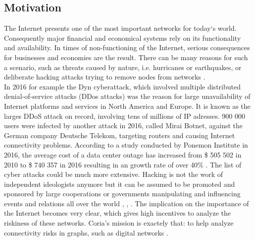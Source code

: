 \documentclass[conference, 11pt]{IEEEtran}
\begin{document}
\subsection{Motivation}
The Internet presents one of the most important networks for today‘s world. Consequently major financial and economical systems rely on its functionality and availability. In times of non-functioning of the Internet, serious consequences for businesses and economies are the result. There can be many reasons for such a scenario, such as threats caused by nature, i.e. hurricanes or earthquakes, or deliberate hacking attacks trying to remove nodes from networks \cite{threats}.\\ \linebreak
In 2016 for example the Dyn cyberattack, which involved multiple distributed denial-of-service attacks (DDos attacks) was the reason for large unavailability of Internet platforms and services in North America and Europe. It is known as the larges DDoS attack on record, involving tens of millions of IP adresses\cite{dyn}. 900 000 users were infected by another attack in 2016, called Mirai Botnet, against the German company Deutsche Telekom, targeting routers and causing Internet connectivity problems\cite{DT}. According to a study conducted by Ponemon Institute in 2016, the average cost of a data center outage has increased from \$ 505 502 in 2010 to \$ 740 357 in 2016 resulting in an growth rate of over 40\% \cite{Ponemon}. The list of cyber attacks could be much more extensive. Hacking is not the work of independent ideologists anymore but it can be assumed to be promoted and sponsored by large cooperations or governments manipulating and influencing events and relations all over the world \cite{cyberSponsors}, \cite{cyberSponsors2}, \cite{cyberSponsors3}. The implication on the importance of the Internet becomes very clear, which gives high incentives to analyze the riskiness of these networks. Coria's mission is exactely that: to help analyze connectivity risks in graphs, such as digital networks\cite{Coria} . \linebreak
\end{document}
